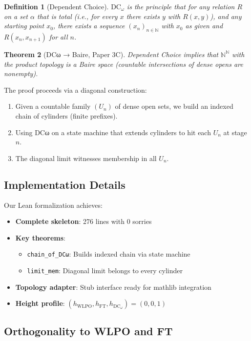 \documentclass[11pt]{article}
\newtheorem{theorem}{Theorem}[section]
\newtheorem{definition}[theorem]{Definition}
\newcommand{\N}{\mathbb{N}}
\newcommand{\WLPO}{\mathrm{WLPO}}
\newcommand{\FT}{\mathrm{FT}}
\newcommand{\DCw}{\mathrm{DC}_\omega}
\begin{document}
\begin{definition}[Dependent Choice]
$\DCw$ is the principle that for any relation $R$ on a set $\alpha$ that is total (i.e., for every $x$ there exists $y$ with $R(x,y)$), and any starting point $x_0$, there exists a sequence $(x_n)_{n \in \N}$ with $x_0$ as given and $R(x_n, x_{n+1})$ for all $n$.
\end{definition}

\begin{theorem}[DCω → Baire, Paper 3C]
Dependent Choice implies that $\N^{\N}$ with the product topology is a Baire space (countable intersections of dense opens are nonempty).
\end{theorem}

The proof proceeds via a diagonal construction:
\begin{enumerate}
\item Given a countable family $(U_n)$ of dense open sets, we build an indexed chain of cylinders (finite prefixes).
\item Using DCω on a state machine that extends cylinders to hit each $U_n$ at stage $n$.
\item The diagonal limit witnesses membership in all $U_n$.
\end{enumerate}

\subsection{Implementation Details}

Our Lean formalization achieves:
\begin{itemize}
\item \textbf{Complete skeleton}: 276 lines with 0 sorries
\item \textbf{Key theorems}:
  \begin{itemize}
  \item \texttt{chain\_of\_DCω}: Builds indexed chain via state machine
  \item \texttt{limit\_mem}: Diagonal limit belongs to every cylinder
  \end{itemize}
\item \textbf{Topology adapter}: Stub interface ready for mathlib integration
\item \textbf{Height profile}: $(h_{\WLPO}, h_{\FT}, h_{\DCw}) = (0, 0, 1)$
\end{itemize}

\subsection{Orthogonality to WLPO and FT}
\end{document}
